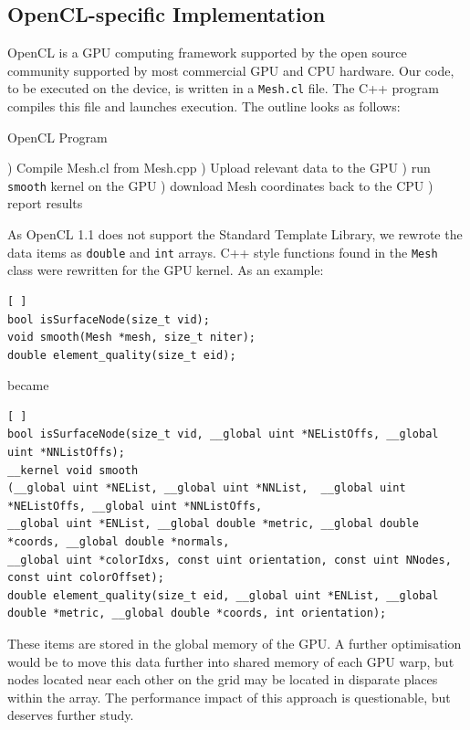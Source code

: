 \documentclass[a4paper,11pt, twocolumn]{article}
\begin{document}
\subsection{OpenCL-specific Implementation}
OpenCL is a GPU computing framework supported by the open source community supported by most commercial GPU and CPU hardware.
Our code, to be executed on the device, is written in a \verb+Mesh.cl+ file.
The C++ program compiles this file and launches execution.  The outline looks as follows:
\begin{algorithm}[H]
\caption{OpenCL Program}
\label{al:colour}
\begin{algorithmic}[1]
) Compile Mesh.cl from Mesh.cpp
) Upload relevant data to the GPU
) run \verb+smooth+ kernel on the GPU
) download Mesh coordinates back to the CPU
) report results
\end{algorithmic}
\end{algorithm}
As OpenCL 1.1 does not support the Standard Template Library, we rewrote the data items as \verb+double+ and \verb+int+ arrays.  C++ style functions found in the \verb+Mesh+ class were rewritten for the GPU kernel.  As an example:
\begin{lstlisting}[ ]
bool isSurfaceNode(size_t vid);
void smooth(Mesh *mesh, size_t niter);
double element_quality(size_t eid);
\end{lstlisting}

became

\begin{lstlisting}[ ]
bool isSurfaceNode(size_t vid, __global uint *NEListOffs, __global uint *NNListOffs);
__kernel void smooth
(__global uint *NEList, __global uint *NNList,  __global uint *NEListOffs, __global uint *NNListOffs,
__global uint *ENList, __global double *metric, __global double *coords, __global double *normals,
__global uint *colorIdxs, const uint orientation, const uint NNodes, const uint colorOffset);
double element_quality(size_t eid, __global uint *ENList, __global double *metric, __global double *coords, int orientation);
\end{lstlisting}
These items are stored in the global memory of the GPU.  A further optimisation would be to move this data further into shared memory of each GPU warp, but nodes located near each other on the grid may be located in disparate places within the array.  The performance impact of this approach is questionable, but deserves further study.
\end{document}

